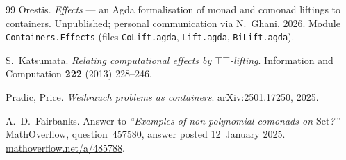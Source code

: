 \documentclass[11pt,a4paper]{book}
\theoremstyle{plain}
\theoremstyle{definition}
\theoremstyle{remark}
\begin{document}
\begin{thebibliography}{99}
 Orestis.
\emph{Effects} --- an Agda formalisation of monad and comonad liftings to containers.
Unpublished; personal communication via N.~Ghani, 2026. Module \texttt{Containers.Effects}
(files \texttt{CoLift.agda}, \texttt{Lift.agda}, \texttt{BiLift.agda}).

 S.~Katsumata.
\emph{Relating computational effects by $\top\top$-lifting}.
Information and Computation \textbf{222} (2013) 228--246.

 Pradic, Price.
\emph{Weihrauch problems as containers}.
\href{https://arxiv.org/abs/2501.17250}{arXiv:2501.17250}, 2025.

 A.~D.~Fairbanks.
Answer to \emph{``Examples of non-polynomial comonads on $\mathrm{Set}$?''}
MathOverflow, question~457580, answer posted 12~January 2025.
\href{https://mathoverflow.net/a/485788}{mathoverflow.net/a/485788}.

\end{thebibliography}
\end{document}
